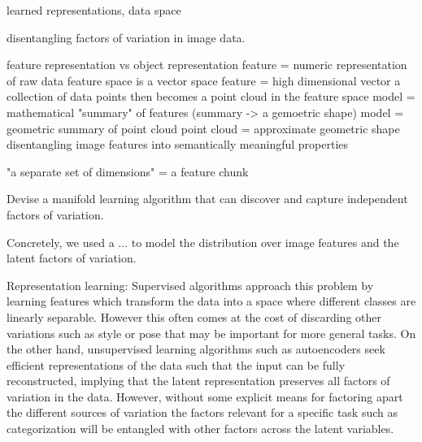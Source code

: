 \documentclass[11pt,a4paper]{article}
\begin{document}
% 

learned representations, data space

disentangling factors of variation in image data. 

feature representation vs object representation
feature = numeric representation of raw data
feature space is a vector space
feature = high dimensional vector
a collection of data points then becomes a point cloud in the feature space 
model = mathematical "summary" of features (summary -> a gemoetric shape)
model = geometric summary of point cloud
point cloud = approximate geometric shape
disentangling image features into semantically meaningful properties

"a separate set of dimensions" = a feature chunk

Devise a manifold learning algorithm that can discover and capture independent factors of variation.

\par Concretely, we used a ... to model the distribution over image features and the latent factors of variation.

Representation learning: Supervised algorithms approach this problem by learning features which transform the data into a space where different classes are linearly separable. However this often comes at the cost of discarding other variations such as style or pose that may be important for more general tasks. On the other hand, unsupervised learning algorithms such as autoencoders seek efficient representations of the data such that the input can be fully reconstructed, implying that the latent representation preserves all factors of variation in the data. However, without some explicit means for factoring apart the different sources of variation the factors relevant for a specific task such as categorization will be entangled with other factors across the latent variables. 
\end{document}
